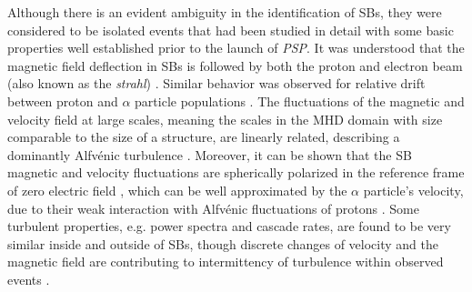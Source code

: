 \documentclass[]{aastex62}
\begin{document}
Although there is an evident ambiguity in the identification of SBs, they were considered to be isolated events \citep{Horbury_2001_GRL,Yamauchi_2004_JGRA,Horbury_2018_MNRAS} that had been studied in detail with some basic properties well established prior to the launch of \emph{PSP}. It was understood that the magnetic field deflection in SBs is followed by both the proton \citep{Neugebauer_2013_AIPC} and electron beam (also known as the \textit{strahl}) \citep{Kahler_1996_JGR}. Similar behavior was observed for relative drift between proton and $\alpha$ particle populations \citep{Yamauchi_2004_JGRA}. The fluctuations of the magnetic and velocity field at large scales, meaning the scales in the MHD domain with size comparable to the size of a structure, are linearly related, describing a dominantly Alfv\'enic turbulence \citep{Gosling_2009_ApJ}.
Moreover, it can be shown that the SB magnetic and velocity fluctuations are spherically polarized in the reference frame of zero electric field \citep{Gosling_2011_ApJ,Matteini_2014_GRL}, which can be well approximated by the $\alpha$ particle's velocity, due to their weak interaction with Alfv\'enic fluctuations of protons \citep{Matteini_2015_ApJ}. Some turbulent properties, e.g.
power spectra and cascade rates, are found to be very similar inside and outside of SBs, though discrete changes of velocity and the magnetic field are contributing to intermittency of turbulence within observed events \citep{Horbury_2018_MNRAS}.
\end{document}
